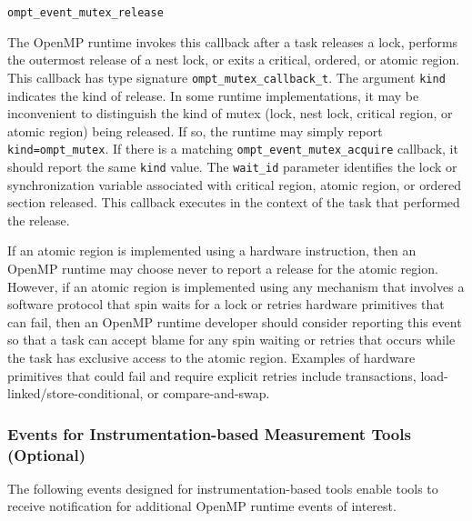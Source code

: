 \documentclass{article}
\newcommand{\descheader}[1]{{\needspace{3\baselineskip}\vspace{1em}\noindent \fbox{#1}}}
\begin{document}
\begin{description}

\item \lstinline|ompt_event_mutex_release| 

   The OpenMP runtime invokes this callback after a task releases a lock, performs the outermost release of a nest lock, or exits a critical, ordered, 
   or atomic region. 
   This callback has type signature \lstinline|ompt_mutex_callback_t|. 
   The argument \lstinline|kind| indicates the kind of release. In some runtime implementations, it may be inconvenient to distinguish the kind of mutex (lock, nest lock, 
   critical region, or atomic region) being released. If so, the runtime may simply report \lstinline|kind=|\lstinline|ompt_mutex|. If there is a matching 
   \lstinline|ompt_event_mutex_acquire| callback, it should report the same \lstinline|kind| value. 
   The \lstinline|wait_id| parameter identifies the lock or synchronization variable
   associated with critical region, atomic region, or ordered section released. This callback executes in the context of the task that performed the release. 

   If an atomic region is implemented using a hardware instruction, then an OpenMP runtime may choose never to report a release for the atomic region. 
   However, if an atomic region is implemented  using any mechanism that involves a software protocol that spin waits for a lock or retries hardware primitives
   that can fail, then an OpenMP 
   runtime developer should consider reporting this event so that a task can accept blame for any spin waiting or retries that occurs while the task has 
   exclusive access to the atomic region.
   Examples of hardware primitives that could fail and require explicit retries include transactions,  
   load-linked/store-conditional, or compare-and-swap.

\end{description}

\subsubsection{Events for Instrumentation-based Measurement Tools (Optional)}
\label{sec:trace-events}

The following events designed for instrumentation-based tools enable tools to receive notification for additional OpenMP runtime events of interest.

\descheader{Tasking}
\end{document}

